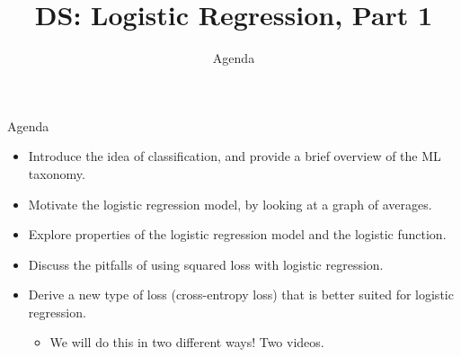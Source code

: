 \documentclass[aspectratio=169]{../latex_main/tntbeamer}  %
\title[Introduction]{DS: Logistic Regression, Part 1}
\subtitle{Agenda}
\begin{document}
	
	\maketitle
	\begin{frame}{Agenda}
	    \begin{itemize}
	        \item Introduce the idea of classification, and provide a brief overview of the ML taxonomy.
	        \item Motivate the logistic regression model, by looking at a graph of averages.
	        \item Explore properties of the logistic regression model and the logistic function.
	        \item Discuss the pitfalls of using squared loss with logistic regression.
	        \item Derive a new type of loss (cross-entropy loss) that is better suited for logistic regression.
	        \begin{itemize}
	            \item We will do this in two different ways! Two videos.
	        \end{itemize}
	    \end{itemize}
	\end{frame}
	
\end{document}
